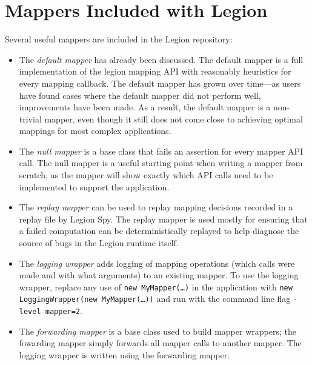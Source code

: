 
%
%

\section{Mappers Included with Legion}

Several useful mappers are included in the Legion repository:
\begin{itemize}
  \item The {\em default mapper} has already been discussed.  The default mapper is a full implementation of the legion mapping
    API with reasonably heuristics for every mapping callback.  The default mapper has grown over time---as users have found cases where
    the default mapper did not perform well, improvements have been made.  As a result, the default mapper is a non-trivial
    mapper, even though it still does not come close to achieving optimal mappings for most complex applications.

  \item The {\em null mapper} is a base class that fails an assertion for every mapper API call.  The null mapper is a useful starting
    point when writing a mapper from scratch, as the mapper will show exactly which API calls need to be implemented to support the application.

    
  \item The {\em replay mapper} can be used to replay mapping decisions recorded in a replay file by Legion Spy.  The replay mapper
    is used mostly for ensuring that a failed computation can be deterministically replayed to help diagnose the source of
    bugs in the Legion runtime itself.

  \item The {\em logging wrapper} adds logging of mapping operations (which calls were made and with what arguments) to an existing mapper.
 To use the logging wrapper, replace any use of {\tt new MyMapper(\ldots)} in the application
with {\tt new LoggingWrapper(new MyMapper(\ldots))} and run with the command line flag
 {\tt -level mapper=2}.

\item  The {\em forwarding mapper } is a base class used to build mapper wrappers; the fowarding mapper simply forwards all mapper
  calls to another mapper.  The logging wrapper is written using the forwarding mapper.
\end{itemize}


